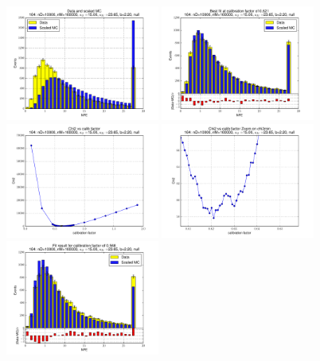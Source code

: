 
 \begin{figure}[htbp] \begin{center} 
\includegraphics[width=0.45\textwidth]{../FIGURES/164/FIG_Data_and_scaled_MC.pdf} 
\includegraphics[width=0.45\textwidth]{../FIGURES/164/FIG_Best_fit_at_calibration_factor_of_0_621.pdf} 
\includegraphics[width=0.45\textwidth]{../FIGURES/164/FIG_Chi2_vs_calib_factor.pdf} 
\includegraphics[width=0.45\textwidth]{../FIGURES/164/FIG_Chi2_vs_calib_factor_Zoom_on_chi2min.pdf} 
\includegraphics[width=0.45\textwidth]{../FIGURES/164/FIG_Fit_result_for_calibration_factor_of_0_568.pdf} 

\end{center}
\end{figure}
